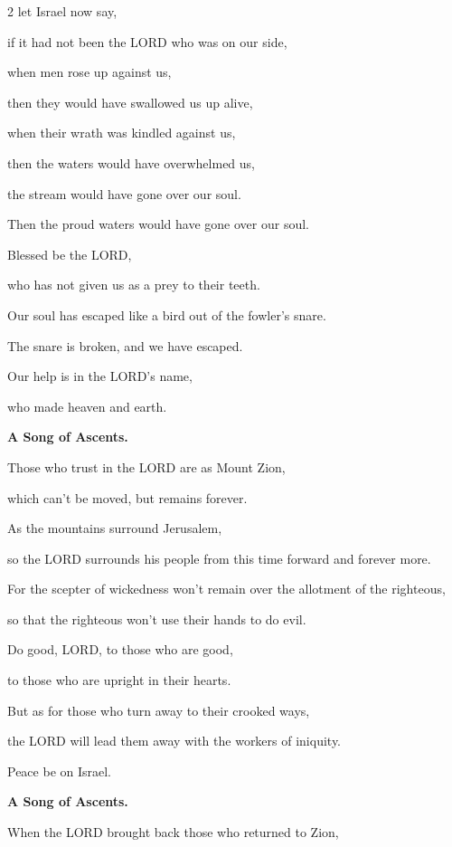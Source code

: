 \begin{multicols}{2}
	let Israel now say,
	
	
	\myverse{}if it had not been the LORD who was on our side,
	
	when men rose up against us,
	
	
	\myverse{}then they would have swallowed us up alive,
	
	when their wrath was kindled against us,
	
	
	\myverse{}then the waters would have overwhelmed us,
	
	the stream would have gone over our soul.
	
	
	\myverse{}Then the proud waters would have gone over our soul.
	
	
	\myverse{}Blessed be the LORD,
	
	who has not given us as a prey to their teeth.
	
	
	\myverse{}Our soul has escaped like a bird out of the fowler’s snare.
	
	The snare is broken, and we have escaped.
	
	
	\myverse{}Our help is in the LORD’s name,
	
	who made heaven and earth.
	
	
	\mychapter{}\textbf{A Song of Ascents.}
	
	\quad\quad\quad \myverse*{}Those who trust in the LORD are as Mount Zion,
	
	which can’t be moved, but remains forever.
	
	
	\myverse{}As the mountains surround Jerusalem,
	
	so the LORD surrounds his people from this time forward and forever more.
	
	
	\myverse{}For the scepter of wickedness won’t remain over the allotment
	of the righteous,
	
	so that the righteous won’t use their hands to do evil.
	
	
	\myverse{}Do good, LORD, to those who are good,
	
	to those who are upright in their hearts.
	
	
	\myverse{}But as for those who turn away to their crooked ways,
	
	the LORD will lead them away with the workers of iniquity.
	
	Peace be on Israel.
	
	
	\mychapter{}\textbf{A Song of Ascents.}
	
	\quad\quad\quad \myverse*{}When the LORD brought back those who returned to Zion,
	

\end{multicols}
